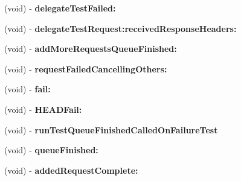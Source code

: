 \begin{DoxyCompactItemize}
\item 
\hypertarget{interface_a_s_i_network_queue_tests_07_08_a3b74243c00c86e888ffc9cb271138dcb}{
(void) -\/ {\bfseries delegate\-Test\-Failed\-:}}
\label{interface_a_s_i_network_queue_tests_07_08_a3b74243c00c86e888ffc9cb271138dcb}

\item 
\hypertarget{interface_a_s_i_network_queue_tests_07_08_a46a23624618c0547cbcbb9ca82c798cb}{
(void) -\/ {\bfseries delegate\-Test\-Request\-:received\-Response\-Headers\-:}}
\label{interface_a_s_i_network_queue_tests_07_08_a46a23624618c0547cbcbb9ca82c798cb}

\item 
\hypertarget{interface_a_s_i_network_queue_tests_07_08_abe54bb28f6c58b48f2e136adebe7591c}{
(void) -\/ {\bfseries add\-More\-Requests\-Queue\-Finished\-:}}
\label{interface_a_s_i_network_queue_tests_07_08_abe54bb28f6c58b48f2e136adebe7591c}

\item 
\hypertarget{interface_a_s_i_network_queue_tests_07_08_ac13a2a0cfd430c066079f46e968de949}{
(void) -\/ {\bfseries request\-Failed\-Cancelling\-Others\-:}}
\label{interface_a_s_i_network_queue_tests_07_08_ac13a2a0cfd430c066079f46e968de949}

\item 
\hypertarget{interface_a_s_i_network_queue_tests_07_08_a672f203e09f2d4f39fb2f1824cd85443}{
(void) -\/ {\bfseries fail\-:}}
\label{interface_a_s_i_network_queue_tests_07_08_a672f203e09f2d4f39fb2f1824cd85443}

\item 
\hypertarget{interface_a_s_i_network_queue_tests_07_08_abebd73c6087a317cf7d40a0694fa0554}{
(void) -\/ {\bfseries \-H\-E\-A\-D\-Fail\-:}}
\label{interface_a_s_i_network_queue_tests_07_08_abebd73c6087a317cf7d40a0694fa0554}

\item 
\hypertarget{interface_a_s_i_network_queue_tests_07_08_a863286b45c212a9aff1fd8c9415e8eb8}{
(void) -\/ {\bfseries run\-Test\-Queue\-Finished\-Called\-On\-Failure\-Test}}
\label{interface_a_s_i_network_queue_tests_07_08_a863286b45c212a9aff1fd8c9415e8eb8}

\item 
\hypertarget{interface_a_s_i_network_queue_tests_07_08_a7d969cf7beaae41da4ec7ee5d2f524d4}{
(void) -\/ {\bfseries queue\-Finished\-:}}
\label{interface_a_s_i_network_queue_tests_07_08_a7d969cf7beaae41da4ec7ee5d2f524d4}

\item 
\hypertarget{interface_a_s_i_network_queue_tests_07_08_ab8add5e0479640989a141e56dfcf046a}{
(void) -\/ {\bfseries added\-Request\-Complete\-:}}
\label{interface_a_s_i_network_queue_tests_07_08_ab8add5e0479640989a141e56dfcf046a}


\end{DoxyCompactItemize}
